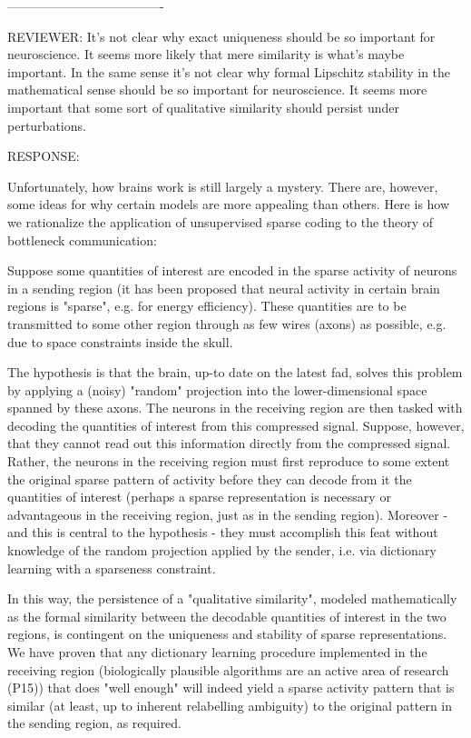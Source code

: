 -------------------------------------

REVIEWER: It's not clear why exact uniqueness should be so important for
neuroscience. It seems more likely that mere similarity is what's maybe
important. In the same sense it's not clear why formal Lipschitz stability
in the mathematical sense should be so important for neuroscience. It seems
more important that some sort of qualitative similarity should persist
under perturbations.

RESPONSE:

Unfortunately, how brains work is still largely a mystery. There are, however, some ideas for why certain models are more appealing than others. Here is how we rationalize the application of unsupervised sparse coding to the theory of bottleneck communication:

Suppose some quantities of interest are encoded in the sparse activity of neurons in a sending region (it has been proposed that neural activity in certain brain regions is "sparse", e.g. for energy efficiency). These quantities are to be transmitted to some other region through as few wires (axons) as possible, e.g. due to space constraints inside the skull.

The hypothesis is that the brain, up-to date on the latest fad, solves this problem by applying a (noisy) "random" projection into the lower-dimensional space spanned by these axons. The neurons in the receiving region are then tasked with decoding the quantities of interest from this compressed signal. Suppose, however, that they cannot read out this information directly from the compressed signal. Rather, the neurons in the receiving region must first reproduce to some extent the original sparse pattern of activity before they can decode from it the quantities of interest (perhaps a sparse representation is necessary or advantageous in the receiving region, just as in the sending region). Moreover - and this is central to the hypothesis - they must accomplish this feat without knowledge of the random projection applied by the sender, i.e. via dictionary learning with a sparseness constraint. 

In this way, the persistence of a "qualitative similarity", modeled mathematically as the formal similarity between the decodable quantities of interest in the two regions, is contingent on the uniqueness and stability of sparse representations. We have proven that any dictionary learning procedure implemented in the receiving region (biologically plausible algorithms are an active area of research (P15)) that does "well enough" will indeed yield a sparse activity pattern that is similar (at least, up to inherent relabelling ambiguity) to the original pattern in the sending region, as required. 

